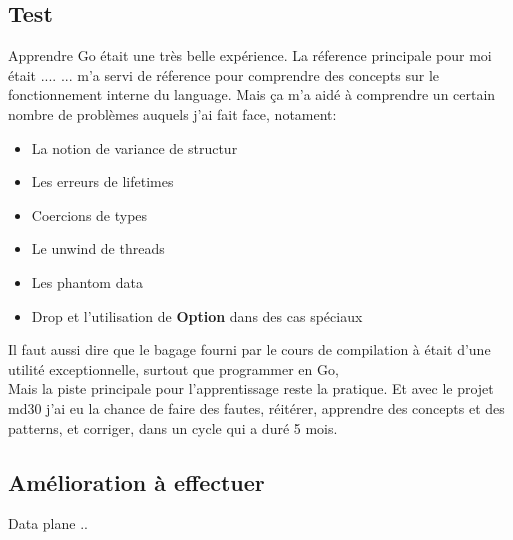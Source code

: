     \subsection{Test }
        Apprendre Go était une très belle expérience. La réference principale
        pour moi était .... 
       ... m'a servi de réference pour
        comprendre des concepts sur le fonctionnement interne du language.
     Mais ça m'a aidé à
        comprendre un certain nombre de problèmes auquels j'ai fait face, notament:
        \begin{itemize}
            \renewcommand{\labelitemi}{$\bullet$}
            \item La notion de variance de structur
            \item Les erreurs de lifetimes
            \item Coercions de types
            \item Le unwind de threads
            \item Les phantom data
            \item Drop et l'utilisation de \textbf{Option} dans des cas spéciaux
        \end{itemize}
        \bigskip
        Il faut aussi dire que le bagage fourni par le cours de compilation à
        \establishment{} était d'une utilité exceptionnelle, surtout que
        programmer en Go, \\[0.3cm]
        Mais la piste principale pour l'apprentissage reste la pratique. Et avec
        le projet \gls{md30} j'ai eu la chance de faire des fautes, réitérer,
        apprendre des concepts et des patterns, et corriger, dans un cycle qui a
        duré 5 mois. 

    \subsection{Amélioration à effectuer}
        Data plane .. 
        